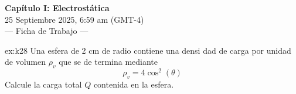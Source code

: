  \begin{multicols}{2}
    \begin{center}
         \LARGE{\textbf{Capítulo I: Electrostática}}\\	
         \vspace{1.2cm}
         \large{25 Septiembre 2025, 6:59 am (GMT-4)}\\
         \large{— Ficha de Trabajo —}
    \end{center}
    \begin{excercise}[][][$Q=44.68\, \rm{\mu C}$]{ex:k28}{
        Una esfera de 2 cm de radio contiene una densi
        dad de carga por unidad de volumen $\rho_v$ que se de
        termina mediante 
        \begin{equation}
            \rho_v=4\cos^2(\theta)
        \end{equation}
         Calcule la carga total $Q$ contenida en la esfera.
         }
    \end{excercise}
    
    
    
    
    
    
    
    
   


\end{multicols}
